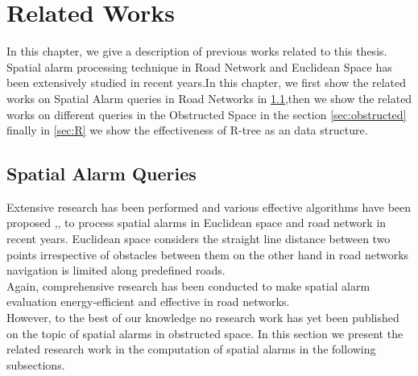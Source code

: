\chapter{Related Works}
\label{chp:relworks}


In this chapter, we give a description of previous works related to this thesis. Spatial alarm processing technique in Road Network and Euclidean Space has been extensively studied in recent years.In this chapter, we first show the related works on Spatial Alarm queries in Road Networks in \ref{sec:spatialalarms},then we show the related works on different queries in the Obstructed Space in the section \ref{sec:obstructed} finally in \ref{sec:R} we show the effectiveness of R-tree as an data structure. \\
\vspace{15pt}

\section{Spatial Alarm Queries}
\label{sec:spatialalarms}
Extensive research has been performed and various  effective algorithms have been proposed \cite{roadalarm},\cite{mur},\cite{bamba} to process spatial alarms in Euclidean space and road network in recent years. Euclidean space considers the straight line distance between two points irrespective of obstacles between them on the other hand in road networks navigation is limited along predefined roads.\\ %
Again, comprehensive research \cite{liu} has been conducted to make spatial alarm evaluation energy-efficient and effective in road networks.\\ 
However, to the best of our knowledge no research work has yet been published on the topic of spatial alarms in obstructed space.
In this section we present the related research work in the computation of spatial alarms in the following subsections.\\

